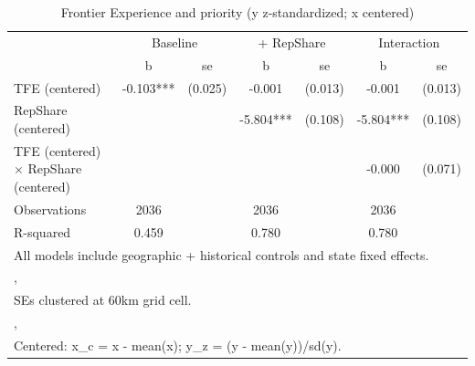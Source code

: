 \begin{table}[htbp]\centering
\def\sym#1{\ifmmode^{#1}\else\(^{#1}\)\fi}
\caption{Frontier Experience and priority (y z-standardized; x centered)}
\begin{tabular}{l*{3}{cc}}
\toprule
                &\multicolumn{2}{c}{Baseline}&\multicolumn{2}{c}{ + RepShare}&\multicolumn{2}{c}{Interaction}\\
                &        b   &       se&        b   &       se&        b   &       se\\
\midrule
TFE (centered)  &   -0.103***&  (0.025)&   -0.001   &  (0.013)&   -0.001   &  (0.013)\\
RepShare (centered)&            &         &   -5.804***&  (0.108)&   -5.804***&  (0.108)\\
TFE (centered) $\times$ RepShare (centered)&            &         &            &         &   -0.000   &  (0.071)\\
\midrule
Observations    &     2036   &         &     2036   &         &     2036   &         \\
R-squared       &    0.459   &         &    0.780   &         &    0.780   &         \\
\bottomrule
\multicolumn{7}{l}{\footnotesize All models include geographic + historical controls and state fixed effects.}\\
\multicolumn{7}{l}{\footnotesize ,}\\
\multicolumn{7}{l}{\footnotesize SEs clustered at 60km grid cell.}\\
\multicolumn{7}{l}{\footnotesize ,}\\
\multicolumn{7}{l}{\footnotesize Centered: x\_c = x - mean(x); y\_z = (y - mean(y))/sd(y).}\\
\end{tabular}
\end{table}

